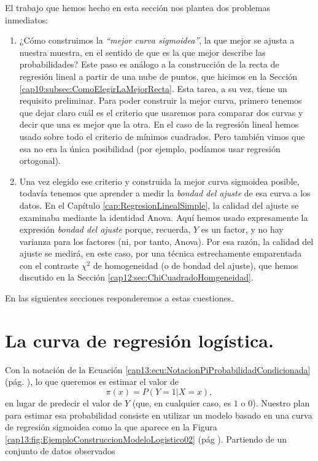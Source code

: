 \noindent El trabajo que hemos hecho en esta sección nos plantea dos problemas inmediatos:
\begin{enumerate}

   \item ¿Cómo construimos la {\em ``mejor curva sigmoidea''}, la que mejor se ajusta a nuestra muestra, en el sentido de que es la que mejor describe las probabilidades? Este paso es análogo a la
       construcción de la recta de regresión lineal a partir de una nube de puntos, que hicimos
       en la Sección \ref{cap10:subsec:ComoElegirLaMejorRecta}. Esta tarea, a su vez, tiene un requisito preliminar. Para poder construir la mejor curva, primero tenemos que dejar claro cuál es el criterio que usaremos para comparar dos curvas y decir que una es mejor que la otra. En el caso de la regresión lineal hemos usado sobre todo el criterio de mínimos cuadrados. Pero también vimos que esa no era la única posibilidad (por ejemplo, podíamos usar regresión ortogonal).

   \item Una vez elegido ese criterio y construida la mejor curva sigmoidea posible, todavía tenemos que aprender a  medir la {\em bondad del ajuste} de esa curva a los datos. En el Capítulo       \ref{cap:RegresionLinealSimple}, la calidad del ajuste se examinaba mediante la identidad Anova. Aquí hemos usado expresamente la expresión {\em bondad del ajuste} porque,  recuerda, $Y$ es un factor, y no hay varianza para los factores (ni, por tanto, Anova). Por esa razón, la calidad del ajuste se medirá, en este caso, por  una técnica estrechamente emparentada con el contraste $\chi^2$ de homogeneidad (o de bondad del ajuste), que hemos discutido en la Sección \ref{cap12:sec:ChiCuadradoHomgeneidad}.

 \end{enumerate}
En las siguientes secciones responderemos a estas cuestiones.

\section{La curva de regresión logística.}
\label{cap13:sec:CurvaLogistica}

Con la notación de la Ecuación \ref{cap13:ecu:NotacionPiProbabilidadCondicionada} (pág. \pageref{cap13:ecu:NotacionPiProbabilidadCondicionada}), lo que queremos es estimar el valor de
\[
\pi(x)=P(Y=1|X=x),
\]
en lugar de predecir el valor de $Y$ (que, en cualquier caso, es $1$ o $0$).
Nuestro plan para estimar esa probabilidad consiste en utilizar un modelo basado en una curva de regresión sigmoidea como la que aparece en la Figura \ref{cap13:fig:EjemploConstruccionModeloLogistico02}
(pág \pageref{cap13:fig:EjemploConstruccionModeloLogistico02}). Partiendo de un conjunto de datos observados


